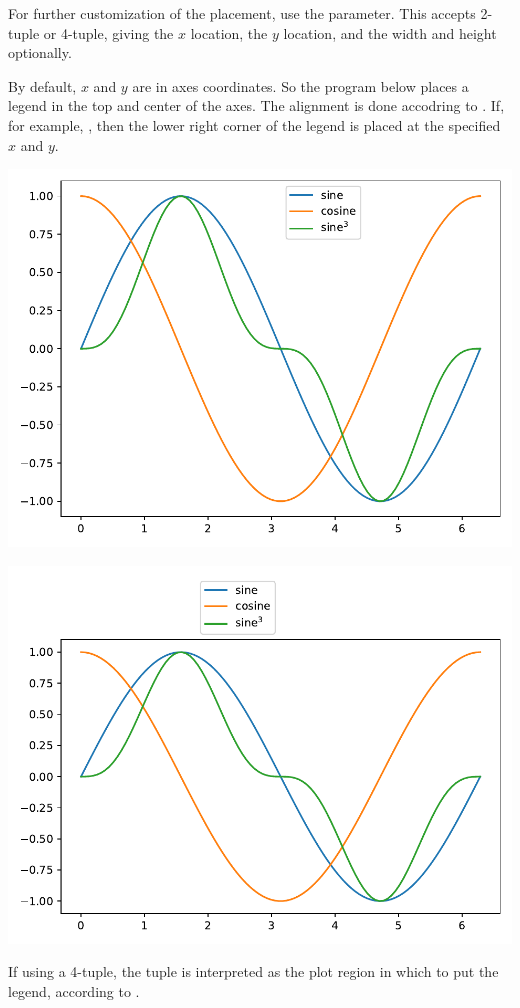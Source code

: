 For further customization of the placement, use the  parameter. This accepts 2-tuple or 4-tuple, giving the $x$ location, the $y$ location, and the width and height optionally.

By default, $x$ and $y$ are in axes coordinates. So the program below places a legend in the top and center of the axes. The alignment is done accodring to . If, for example, , then the lower right corner of the legend is placed at the specified $x$ and $y$. 


\begin{center}
    \includegraphics[width = .7\textwidth]{figures/proseplots/legend-bb.pdf}
\end{center}


\begin{center}
    \includegraphics[width = .7\textwidth]{figures/proseplots/legend-bb-loc.pdf}
\end{center}
If using a 4-tuple, the tuple is interpreted as the plot region in which to put the legend, according to . 

